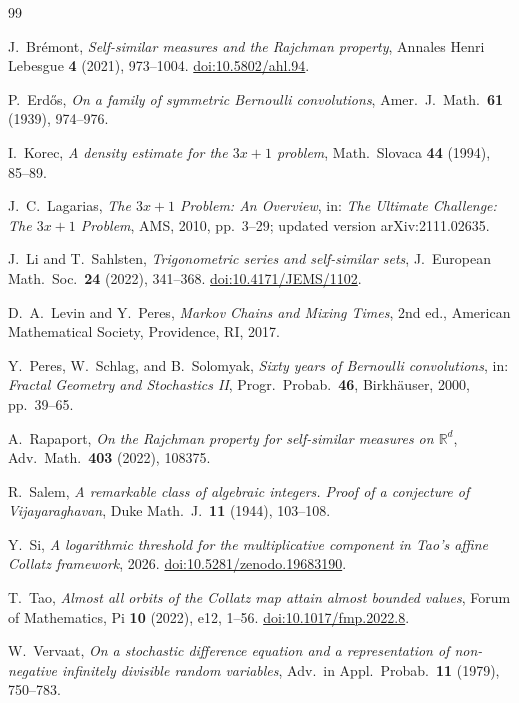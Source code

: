 \documentclass[11pt,a4paper]{amsart}
\theoremstyle{plain}
\theoremstyle{definition}
\begin{document}
\begin{thebibliography}{99}

J.~Br\'emont,
\emph{Self-similar measures and the Rajchman property},
Annales Henri Lebesgue \textbf{4} (2021), 973--1004.
\href{https://doi.org/10.5802/ahl.94}{doi:10.5802/ahl.94}.

P.~Erd\H{o}s,
\emph{On a family of symmetric Bernoulli convolutions},
Amer.~J.~Math.~\textbf{61} (1939), 974--976.

I.~Korec,
\emph{A density estimate for the $3x+1$ problem},
Math.~Slovaca \textbf{44} (1994), 85--89.

J.~C.~Lagarias,
\emph{The $3x+1$ Problem: An Overview},
in: \emph{The Ultimate Challenge: The $3x+1$ Problem},
AMS, 2010, pp.~3--29; updated version arXiv:2111.02635.

J.~Li and T.~Sahlsten,
\emph{Trigonometric series and self-similar sets},
J.~European Math.~Soc.~\textbf{24} (2022), 341--368.
\href{https://doi.org/10.4171/JEMS/1102}{doi:10.4171/JEMS/1102}.

D.~A.~Levin and Y.~Peres,
\emph{Markov Chains and Mixing Times}, 2nd ed.,
American Mathematical Society, Providence, RI, 2017.

Y.~Peres, W.~Schlag, and B.~Solomyak,
\emph{Sixty years of Bernoulli convolutions},
in: \emph{Fractal Geometry and Stochastics II},
Progr.~Probab.~\textbf{46}, Birkh\"auser, 2000, pp.~39--65.

A.~Rapaport,
\emph{On the Rajchman property for self-similar measures on $\mathbb R^d$},
Adv.~Math.~\textbf{403} (2022), 108375.

R.~Salem,
\emph{A remarkable class of algebraic integers.  Proof of a conjecture
of Vijayaraghavan},
Duke Math.~J.~\textbf{11} (1944), 103--108.

Y.~Si,
\emph{A logarithmic threshold for the multiplicative component in Tao's
affine Collatz framework}, 2026.
\href{https://doi.org/10.5281/zenodo.19683190}{doi:10.5281/zenodo.19683190}.

T.~Tao,
\emph{Almost all orbits of the Collatz map attain almost bounded values},
Forum of Mathematics, Pi \textbf{10} (2022), e12, 1--56.
\href{https://doi.org/10.1017/fmp.2022.8}{doi:10.1017/fmp.2022.8}.

W.~Vervaat,
\emph{On a stochastic difference equation and a representation of
non-negative infinitely divisible random variables},
Adv.~in Appl.~Probab.~\textbf{11} (1979), 750--783.

\end{thebibliography}
\end{document}
